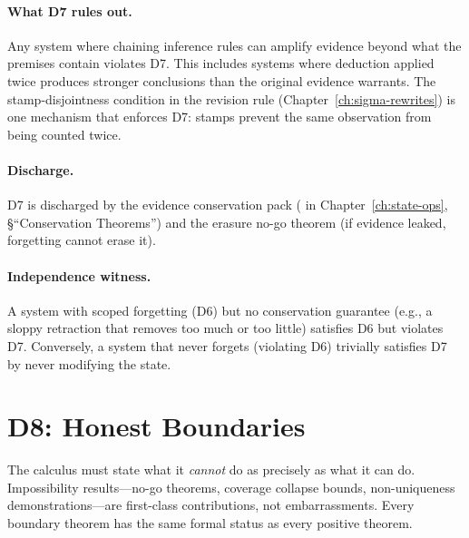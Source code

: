 \documentclass[11pt,openany]{report}
\begin{document}
\paragraph{What D7 rules out.}
Any system where chaining inference rules can amplify evidence beyond
what the premises contain violates D7.  This includes systems where
deduction applied twice produces stronger conclusions than the
original evidence warrants.  The stamp-disjointness condition in the
revision rule (Chapter~\ref{ch:sigma-rewrites}) is one mechanism that
enforces D7: stamps prevent the same observation from being counted
twice.

\paragraph{Discharge.}
D7 is discharged by the evidence conservation pack
( in
Chapter~\ref{ch:state-ops}, \S``Conservation Theorems'') and the
erasure no-go theorem (if evidence leaked, forgetting cannot erase
it).

\paragraph{Independence witness.}
A system with scoped forgetting (D6) but no conservation guarantee
(e.g., a sloppy retraction that removes too much or too little)
satisfies D6 but violates D7.  Conversely, a system that never forgets
(violating D6) trivially satisfies D7 by never modifying the state.



\section{D8: Honest Boundaries}
\label{sec:d8}

\begin{definition}
\label{def:d8}
The calculus must state what it \emph{cannot} do as precisely as what
it can do.  Impossibility results---no-go theorems, coverage collapse
bounds, non-uniqueness demonstrations---are first-class contributions,
not embarrassments.  Every boundary theorem has the same formal status
as every positive theorem.
\end{definition}
\end{document}
